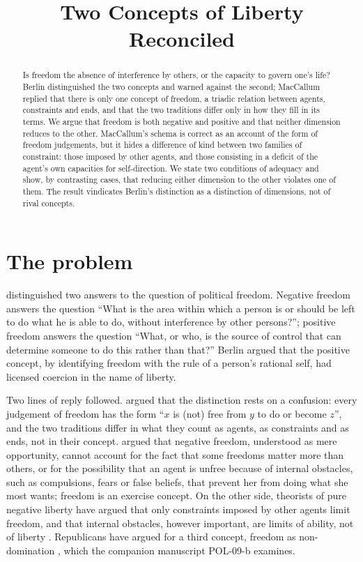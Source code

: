 \documentclass{situationist-preprint}
\title{Two Concepts of Liberty Reconciled}
\begin{document}
\maketitle

\begin{abstract}
Is freedom the absence of interference by others, or the capacity to govern one's life? Berlin distinguished the two concepts and warned against the second; MacCallum replied that there is only one concept of freedom, a triadic relation between agents, constraints and ends, and that the two traditions differ only in how they fill in its terms. We argue that freedom is both negative and positive and that neither dimension reduces to the other. MacCallum's schema is correct as an account of the form of freedom judgements, but it hides a difference of kind between two families of constraint: those imposed by other agents, and those consisting in a deficit of the agent's own capacities for self-direction. We state two conditions of adequacy and show, by contrasting cases, that reducing either dimension to the other violates one of them. The result vindicates Berlin's distinction as a distinction of dimensions, not of rival concepts.
\end{abstract}

\section{The problem}

\citet{Berlin1958} distinguished two answers to the question of political freedom. Negative freedom answers the question \enquote{What is the area within which a person is or should be left to do what he is able to do, without interference by other persons?}; positive freedom answers the question \enquote{What, or who, is the source of control that can determine someone to do this rather than that?} Berlin argued that the positive concept, by identifying freedom with the rule of a person's rational self, had licensed coercion in the name of liberty.

Two lines of reply followed. \citet{MacCallum1967} argued that the distinction rests on a confusion: every judgement of freedom has the form \enquote{$x$ is (not) free from $y$ to do or become $z$}, and the two traditions differ in what they count as agents, as constraints and as ends, not in their concept. \citet{Taylor1979} argued that negative freedom, understood as mere opportunity, cannot account for the fact that some freedoms matter more than others, or for the possibility that an agent is unfree because of internal obstacles, such as compulsions, fears or false beliefs, that prevent her from doing what she most wants; freedom is an exercise concept. On the other side, theorists of pure negative liberty have argued that only constraints imposed by other agents limit freedom, and that internal obstacles, however important, are limits of ability, not of liberty \citep{Steiner1994,Carter1999}. Republicans have argued for a third concept, freedom as non-domination \citep{Pettit1997,Skinner1998}, which the companion manuscript POL-09-b examines.
\end{document}
